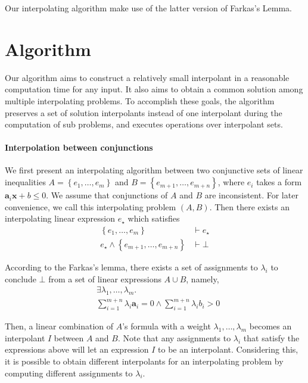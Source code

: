 Our interpolating algorithm make use of the latter version of Farkas's
Lemma.


\section{Algorithm}

Our algorithm aims to construct a relatively small interpolant in a
reasonable computation time for any input.  It also aims to obtain a
common solution among multiple interpolating problems.
To accomplish these goals, the algorithm preserves a set of solution
interpolants instead of one interpolant during the computation of sub
problems, and executes operations over interpolant sets.


\paragraph{Interpolation between conjunctions}
We first present an interpolating algorithm between two conjunctive
sets of linear inequalities $A = \left\lbrace e_1,\ldots,e_m
\right\rbrace$ and $B = \left\lbrace e_{m+1},\ldots,e_{m+n}
\right\rbrace$, where $e_i$ takes a form $\mathbf{a}_i \mathbf{x} + b
\leq 0$.  We assume that conjunctions of $A$ and $B$ are inconsistent.
For later convenience, we call this interpolating problem $\left( A, B
\right)$.  Then there exists an interpolating linear expression
$e_\star$ which satisfies
\begin{align*}
\left\lbrace e_1,\ldots,e_m \right\rbrace & \vdash e_\star \\
e_\star \wedge \left\lbrace e_{m+1},\ldots,e_{m+n} \right\rbrace & \vdash \bot
\end{align*}

According to the Farkas's lemma, there exists a set of assignments to
$\lambda_i$ to conclude $\bot$ from a set of linear expressions $A
\cup B$, namely,
\begin{align*}
& \exists \lambda_1, \ldots, \lambda_m. \\
& \sum_{i=1}^{m+n} \lambda_i \mathbf{a}_i = 0\wedge \sum_{i=1}^{m+n} \lambda_i b_i > 0
\end{align*}

Then, a linear combination of $A$'s formula with a weight $\lambda_1,
\ldots, \lambda_m$ becomes an interpolant $I$ between $A$ and $B$.
Note that any assignments to $\lambda_i$ that satisfy the expressions
above will let an expression $I$ to be an interpolant.  Considering
this, it is possible to obtain different interpolants for an
interpolating problem by computing different assignments to
$\lambda_i$.

